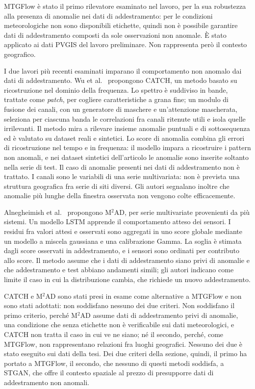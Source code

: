 MTGFlow è stato il primo rilevatore esaminato nel lavoro, per la sua robustezza alla presenza di anomalie nei dati di addestramento: per le condizioni meteorologiche non sono disponibili etichette, quindi non è possibile garantire dati di addestramento composti da sole osservazioni non anomale. È stato applicato ai dati PVGIS del lavoro preliminare. Non rappresenta però il contesto geografico.

I due lavori più recenti esaminati imparano il comportamento non anomalo dai dati di addestramento. Wu et al.~\cite{wu2025catch} propongono CATCH, un metodo basato su ricostruzione nel dominio della frequenza. Lo spettro è suddiviso in bande, trattate come \emph{patch}, per cogliere caratteristiche a grana fine; un modulo di fusione dei canali, con un generatore di maschere e un'attenzione mascherata, seleziona per ciascuna banda le correlazioni fra canali ritenute utili e isola quelle irrilevanti. Il metodo mira a rilevare insieme anomalie puntuali e di sottosequenza ed è valutato su dataset reali e sintetici. Lo score di anomalia combina gli errori di ricostruzione nel tempo e in frequenza: il modello impara a ricostruire i pattern non anomali, e nei dataset sintetici dell'articolo le anomalie sono inserite soltanto nella serie di test. Il caso di anomalie presenti nei dati di addestramento non è trattato. I canali sono le variabili di una serie multivariata: non è prevista una struttura geografica fra serie di siti diversi. Gli autori segnalano inoltre che anomalie più lunghe della finestra osservata non vengono colte efficacemente.

Alnegheimish et al.~\cite{alnegheimish2025m2ad} propongono M$^2$AD, per serie multivariate provenienti da più sistemi. Un modello LSTM apprende il comportamento atteso dei sensori. I residui fra valori attesi e osservati sono aggregati in uno score globale mediante un modello a miscela gaussiana e una calibrazione Gamma. La soglia è stimata dagli score osservati in addestramento, e i sensori sono ordinati per contributo allo score. Il metodo assume che i dati di addestramento siano privi di anomalie e che addestramento e test abbiano andamenti simili; gli autori indicano come limite il caso in cui la distribuzione cambia, che richiede un nuovo addestramento.

CATCH e M$^2$AD sono stati presi in esame come alternative a MTGFlow e non sono stati adottati: non soddisfano nessuno dei due criteri. Non soddisfano il primo criterio, perché M$^2$AD assume dati di addestramento privi di anomalie, una condizione che senza etichette non è verificabile sui dati meteorologici, e CATCH non tratta il caso in cui ve ne siano; né il secondo, perché, come MTGFlow, non rappresentano relazioni fra luoghi geografici. Nessuno dei due è stato eseguito sui dati della tesi. Dei due criteri della sezione, quindi, il primo ha portato a MTGFlow, il secondo, che nessuno di questi metodi soddisfa, a STGAN, che offre il contesto spaziale al prezzo di presupporre dati di addestramento non anomali.

